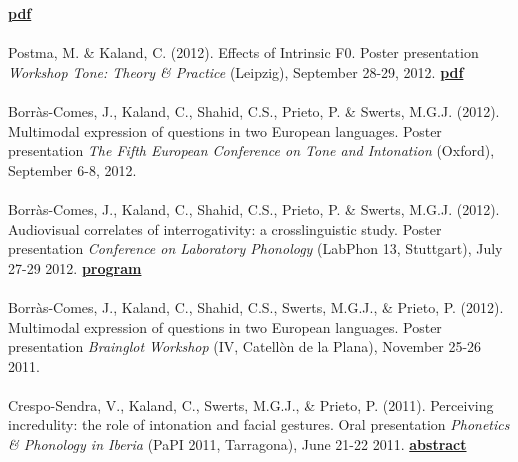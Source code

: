 \documentclass[a4paper,11pt]{article}
\begin{document}
 \textcolor{red}{\textbf{\lbrack\href{http://mindmodeling.org/cogsci2013/papers/0222/paper0222.pdf}{pdf}\rbrack}}\\\\
Postma, M. \& Kaland, C. (2012). Effects of Intrinsic F0. Poster presentation \textit{Workshop Tone: Theory \& Practice} (Leipzig), September 28-29, 2012. \textcolor{red}{\textbf{\lbrack\href{http://www.eva.mpg.de/lingua/conference/2012_Tone/pdf/Postma_Kaland_abstract.pdf}{pdf}\rbrack}}\\\\
Borr\`as-Comes, J., Kaland, C., Shahid, C.S., Prieto, P. \& Swerts, M.G.J. (2012). Multimodal expression of questions in two European languages. Poster presentation \textit{The Fifth European Conference on Tone and Intonation} (Oxford), September 6-8, 2012.\\\\
Borr\`as-Comes, J., Kaland, C., Shahid, C.S., Prieto, P. \& Swerts, M.G.J. (2012). Audiovisual correlates of interrogativity: a crosslinguistic study. Poster presentation \textit{Conference on Laboratory Phonology} (LabPhon 13, Stuttgart), July 27-29 2012. \textcolor{red}{\textbf{\lbrack\href{http://www.labphon.org/LabPhon13/program.html}{program}\rbrack}}\\\\
Borr\`as-Comes, J., Kaland, C., Shahid, C.S., Swerts, M.G.J., \& Prieto, P. (2012). Multimodal expression of questions in two European languages. Poster presentation \textit{Brainglot Workshop} (IV, Catell\`on de la Plana), November 25-26 2011.\\\\
Crespo-Sendra, V., Kaland, C., Swerts, M.G.J., \& Prieto, P. (2011). Perceiving incredulity: the role of intonation and facial gestures. Oral presentation \textit{Phonetics \& Phonology in Iberia} (PaPI 2011, Tarragona), June 21-22 2011. \textcolor{red}{\textbf{\lbrack\href{http://wwwa.urv.cat/deaa/PaPI2011/program_files/Perceiving\%20incredulity.pdf}{abstract}\rbrack}}\\\\

\newpage
\end{document}
